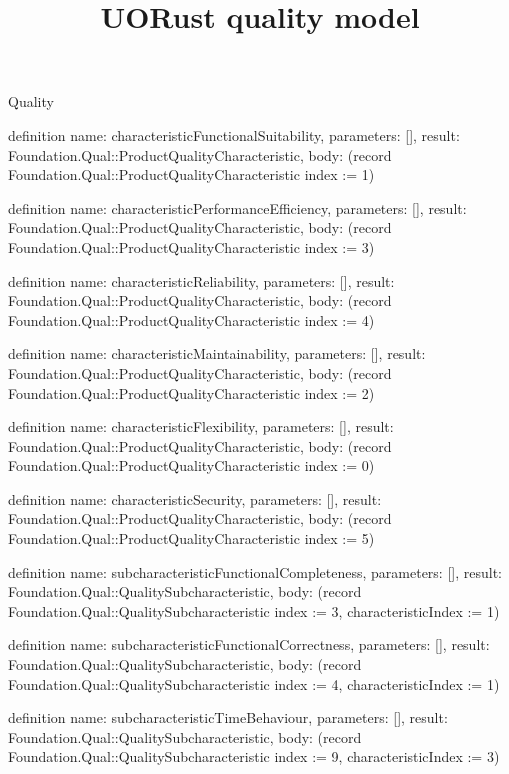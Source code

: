 \begin{lexlean}{Quality}
\title{UORust quality model}
\begin{semanticmodule}
definition{
  name: characteristicFunctionalSuitability,
  parameters: [],
  result: Foundation.Qual::ProductQualityCharacteristic,
  body: (record Foundation.Qual::ProductQualityCharacteristic {index := 1})
}

definition{
  name: characteristicPerformanceEfficiency,
  parameters: [],
  result: Foundation.Qual::ProductQualityCharacteristic,
  body: (record Foundation.Qual::ProductQualityCharacteristic {index := 3})
}

definition{
  name: characteristicReliability,
  parameters: [],
  result: Foundation.Qual::ProductQualityCharacteristic,
  body: (record Foundation.Qual::ProductQualityCharacteristic {index := 4})
}

definition{
  name: characteristicMaintainability,
  parameters: [],
  result: Foundation.Qual::ProductQualityCharacteristic,
  body: (record Foundation.Qual::ProductQualityCharacteristic {index := 2})
}

definition{
  name: characteristicFlexibility,
  parameters: [],
  result: Foundation.Qual::ProductQualityCharacteristic,
  body: (record Foundation.Qual::ProductQualityCharacteristic {index := 0})
}

definition{
  name: characteristicSecurity,
  parameters: [],
  result: Foundation.Qual::ProductQualityCharacteristic,
  body: (record Foundation.Qual::ProductQualityCharacteristic {index := 5})
}

definition{
  name: subcharacteristicFunctionalCompleteness,
  parameters: [],
  result: Foundation.Qual::QualitySubcharacteristic,
  body: (record Foundation.Qual::QualitySubcharacteristic {index := 3, characteristicIndex := 1})
}

definition{
  name: subcharacteristicFunctionalCorrectness,
  parameters: [],
  result: Foundation.Qual::QualitySubcharacteristic,
  body: (record Foundation.Qual::QualitySubcharacteristic {index := 4, characteristicIndex := 1})
}

definition{
  name: subcharacteristicTimeBehaviour,
  parameters: [],
  result: Foundation.Qual::QualitySubcharacteristic,
  body: (record Foundation.Qual::QualitySubcharacteristic {index := 9, characteristicIndex := 3})
}


\end{semanticmodule}
\end{lexlean}
